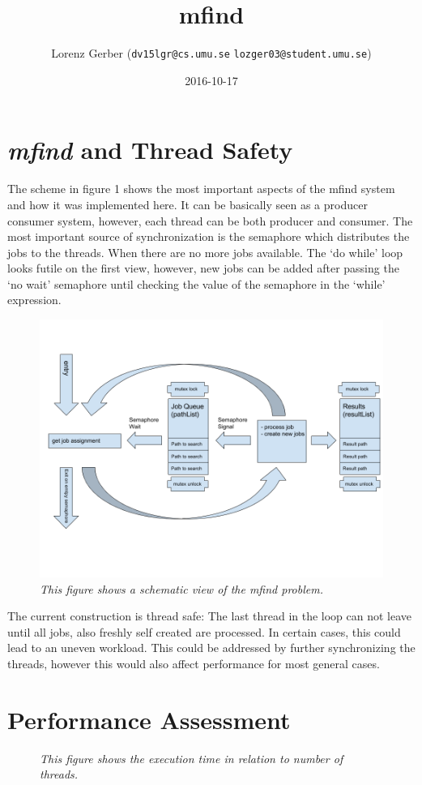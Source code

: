 \documentclass[a4paper,11pt,twoside]{article}
\title{mfind}
\author{Lorenz Gerber ({\tt{dv15lgr@cs.umu.se}} {\tt{lozger03@student.umu.se}})}
\date{2016-10-17}
\begin{document}
\lstset{language=C}
\maketitle
\thispagestyle{empty}
\newpage
\tableofcontents
\thispagestyle{empty}
\newpage

\clearpage
{}

\section{\textit{mfind} and Thread Safety} 

The scheme in figure 1 shows the most important aspects of the mfind system and how it was implemented here. It can be basically seen as a producer consumer system, however, each thread can be both producer and consumer. The most important source of synchronization is the semaphore which distributes the jobs to the threads. When there are no more jobs available. The `do while' loop looks futile on the first view, however, new jobs can be added after passing the `no wait' semaphore until checking the value of the semaphore in the `while' expression.

\begin{figure}
\centering
\includegraphics[width=\textwidth]{schema.png}
\caption{\textit{This figure shows a schematic view of the mfind problem.}}
\label{fig:scheme}
\end{figure}

The current construction is thread safe: The last thread in the loop can not leave until all jobs, also freshly self created are processed. In certain cases, this could lead to an uneven workload. This could be addressed by further synchronizing the threads, however this would also affect performance for most general cases. 


\section{Performance Assessment}

\begin{figure}
\centering
\caption{\textit{This figure shows the execution time in relation to number of threads.}}
\label{fig:perform}
\end{figure}





\end{document}
